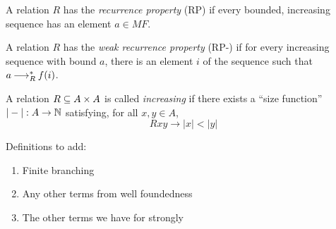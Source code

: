 
\begin{definition}\label{d:RP}
    A relation $R$ has the \emph{recurrence property} (RP) if every bounded, increasing sequence 
    has an element $a \in MF$.
\end{definition}


\begin{definition}\label{d:RP-}
    A relation $R$ has the \emph{weak recurrence property} (RP-) if for every increasing 
    sequence with bound $a$, there is an element $i$ of the sequence such that 
    $a \mathbin{\longrightarrow_R^*} f(i)$.
\end{definition}







\begin{definition}
    \label{d:inc}
    A relation $R \subseteq A \times A$ is called \emph{increasing} if there
    exists a ``size function'' $|-| : A \to \mathbb{N}$ satisfying, for all $x, y \in A$,
    \[ Rxy \to |x| < |y| \]
\end{definition}

Definitions to add:
\begin{enumerate}
    \item Finite branching
    \item Any other terms from well foundedness
    \item The other terms we have for strongly
\end{enumerate}
